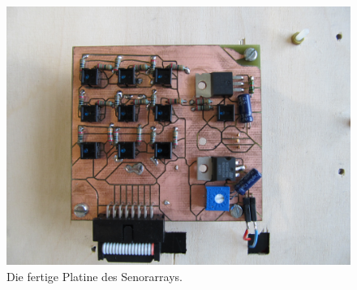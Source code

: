 \documentclass[a4paper,bibtotoc,oneside]{scrbook}
\begin{document}
\begin{figure}[htbp]
\centering
\includegraphics[width=125mm]{img/sensor_array.jpg}
\caption{Die fertige Platine des Senorarrays.}\label{array3}
\end{figure}
\end{document}
